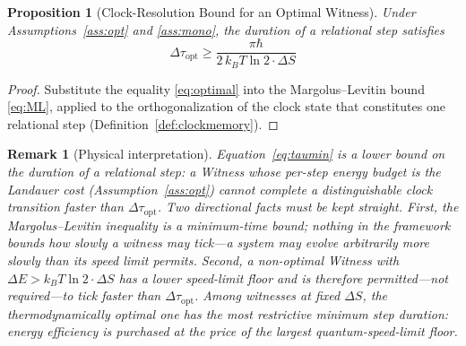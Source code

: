 \documentclass[11pt, a4paper]{article}
\newtheorem{proposition}{Proposition}
\newtheorem{remark}{Remark}
\begin{document}
\begin{proposition}[Clock-Resolution Bound for an Optimal Witness]
\label{prop:bound}
Under Assumptions~\ref{ass:opt} and \ref{ass:mono}, the duration of a relational step satisfies
\begin{equation}
\boxed{\;\Delta\tau_{\mathrm{opt}} \geq \frac{\pi\hbar}{2\, k_B T \ln 2 \cdot \Delta S}\;}
\label{eq:taumin}
\end{equation}
\end{proposition}

\begin{proof}
Substitute the equality \eqref{eq:optimal} into the Margolus--Levitin bound \eqref{eq:ML}, applied to the orthogonalization of the clock state that constitutes one relational step (Definition~\ref{def:clockmemory}).
\end{proof}

\begin{remark}[Physical interpretation]
\label{rem:interp}
Equation~\eqref{eq:taumin} is a \emph{lower bound} on the duration of a relational step: a Witness whose per-step energy budget is the Landauer cost (Assumption~\ref{ass:opt}) cannot complete a distinguishable clock transition faster than $\Delta\tau_{\mathrm{opt}}$. Two directional facts must be kept straight. First, the Margolus--Levitin inequality is a minimum-time bound; nothing in the framework bounds how \emph{slowly} a witness may tick---a system may evolve arbitrarily more slowly than its speed limit permits. Second, a non-optimal Witness with $\Delta E > k_B T \ln 2 \cdot \Delta S$ has a lower speed-limit floor and is therefore \emph{permitted}---not required---to tick faster than $\Delta\tau_{\mathrm{opt}}$. Among witnesses at fixed $\Delta S$, the thermodynamically optimal one has the most restrictive minimum step duration: energy efficiency is purchased at the price of the largest quantum-speed-limit floor.
\end{remark}
\end{document}
